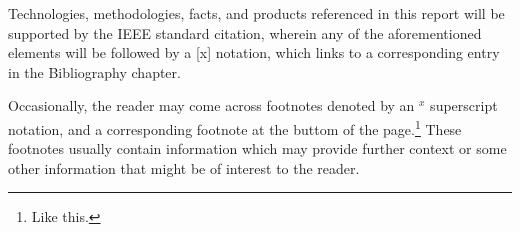 Technologies, methodologies, facts, and products referenced in this report will be supported by the IEEE standard citation, wherein any of the aforementioned elements will be followed by a [x] notation, which links to a corresponding entry in the Bibliography chapter.

Occasionally, the reader may come across footnotes denoted by an $^x$ superscript notation, and a corresponding footnote at the buttom of the page.\footnote{Like this.} These footnotes usually contain information which may provide further context or some other information that might be of interest to the reader.